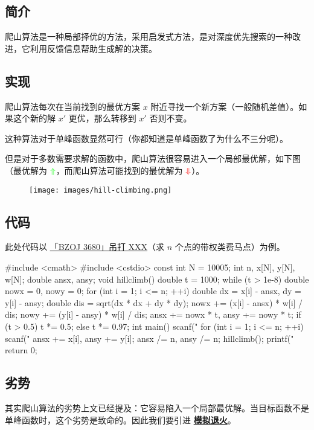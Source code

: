 
\subsection{简介}

爬山算法是一种局部择优的方法，采用启发式方法，是对深度优先搜索的一种改进，它利用反馈信息帮助生成解的决策。

\hr

\subsection{实现}

爬山算法每次在当前找到的最优方案 $x$ 附近寻找一个新方案（一般随机差值）。如果这个新的解 $x'$ 更优，那么转移到 $x'$ 否则不变。

这种算法对于单峰函数显然可行（你都知道是单峰函数了为什么不三分呢）。

但是对于多数需要求解的函数中，爬山算法很容易进入一个局部最优解，如下图（最优解为 $\color{green}{\Uparrow}$，而爬山算法可能找到的最优解为 $\color{red}{\Downarrow}$）。

\begin{figure}[h]
\centering
\texttt{[image: images/hill-climbing.png]} 

\end{figure}

\hr

\subsection{代码}

此处代码以 \href{https://www.lydsy.com/JudgeOnline/problem.php?id=3680}{「BZOJ 3680」吊打 XXX}（求 $n$ 个点的带权类费马点）为例。

\begin{cppcode}
#include <cmath>
#include <cstdio>
const int N = 10005;
int n, x[N], y[N], w[N];
double ansx, ansy;
void hillclimb() {
  double t = 1000;
  while (t > 1e-8) {
    double nowx = 0, nowy = 0;
    for (int i = 1; i <= n; ++i) {
      double dx = x[i] - ansx, dy = y[i] - ansy;
      double dis = sqrt(dx * dx + dy * dy);
      nowx += (x[i] - ansx) * w[i] / dis;
      nowy += (y[i] - ansy) * w[i] / dis;
    }
    ansx += nowx * t, ansy += nowy * t;
    if (t > 0.5)
      t *= 0.5;
    else
      t *= 0.97;
  }
}
int main() {
  scanf("%
  for (int i = 1; i <= n; ++i) {
    scanf("%
    ansx += x[i], ansy += y[i];
  }
  ansx /= n, ansy /= n;
  hillclimb();
  printf("%
  return 0;
}
\end{cppcode}

\hr

\subsection{劣势}

其实爬山算法的劣势上文已经提及：它容易陷入一个局部最优解。当目标函数不是单峰函数时，这个劣势是致命的。因此我们要引进 \href{/misc/simulated-annealing/}{\textbf{模拟退火}}。

